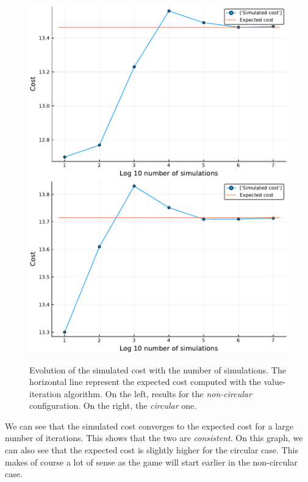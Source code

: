 \begin{figure}[H]
\centering
\includegraphics[scale=0.51]{../img/board_unif_low/cost_iterations_log_noncirc.pdf}
\includegraphics[scale=0.51]{../img/board_unif_low/cost_iterations_log_circ.pdf}
\caption{Evolution of the simulated cost with the number of simulations. The horizontal line represent the expected cost computed with the value-iteration algorithm. On the left, results for the \emph{non-circular} configuration. On the right, the \emph{circular} one.}
\label{fig:cost_iterations_log}
\end{figure}

We can see that the simulated cost converges to the expected cost for a large number of iterations.
This shows that the two are \emph{consistent}.
On this graph, we can also see that the expected cost is slightly higher for the circular case. 
This makes of course a lot of sense as the game will start earlier in the non-circular case. 

